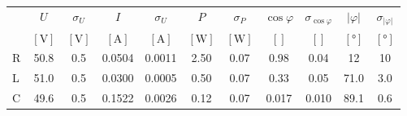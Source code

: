 \begin{tabular}{
    l
    S[table-format=2.1]
    S[table-format=1.1]
    S[table-format=1.4]
    S[table-format=1.4]
    S[table-format=1.2]
    S[table-format=1.2]
    S[table-format=1.2]
    S[table-format=1.2]
    S[table-format=2.1]
    S[table-format=2.1]
} \toprule
  & {$U$}            & {$\sigma_U$}     & {$I$}              & {$\sigma_U$}       & {$P$}            & {$\sigma_P$}     & {$\cos \varphi$} & {$\sigma_{\cos \varphi}$} & {$|\varphi|$}      & {$\sigma_{|\varphi|}$} \\
  & {$[\si{\volt}]$} & {$[\si{\volt}]$} & {$[\si{\ampere}]$} & {$[\si{\ampere}]$} & {$[\si{\watt}]$} & {$[\si{\watt}]$} & {$[]$}           & {$[]$}                    & {$[\si{\degree}]$} & {$[\si{\degree}]$}     \\ \midrule
R & 50.8             & 0.5              & 0.0504             & 0.0011             & 2.50             & 0.07             & 0.98             & 0.04                      & 12                 & 10                     \\
L & 51.0             & 0.5              & 0.0300             & 0.0005             & 0.50             & 0.07             & 0.33             & 0.05                      & 71.0               & 3.0                    \\
C & 49.6             & 0.5              & 0.1522             & 0.0026             & 0.12             & 0.07             & 0.017            & 0.010                     & 89.1               & 0.6                    \\ \bottomrule
\end{tabular}